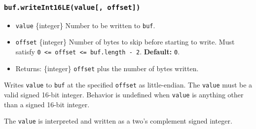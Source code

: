 \subsubsection{\texorpdfstring{\texttt{buf.writeInt16LE(value{[},\ offset{]})}}{buf.writeInt16LE(value{[}, offset{]})}}\label{buf.writeint16levalue-offset}

\begin{itemize}
\tightlist
\item
  \texttt{value} \{integer\} Number to be written to \texttt{buf}.
\item
  \texttt{offset} \{integer\} Number of bytes to skip before starting to
  write. Must satisfy
  \texttt{0\ \textless{}=\ offset\ \textless{}=\ buf.length\ -\ 2}.
  \textbf{Default:} \texttt{0}.
\item
  Returns: \{integer\} \texttt{offset} plus the number of bytes written.
\end{itemize}

Writes \texttt{value} to \texttt{buf} at the specified \texttt{offset}
as little-endian. The \texttt{value} must be a valid signed 16-bit
integer. Behavior is undefined when \texttt{value} is anything other
than a signed 16-bit integer.

The \texttt{value} is interpreted and written as a two's complement
signed integer.

\begin{Shaded}
\begin{Highlighting}[]
\NormalTok{ \{ }\NormalTok{ \} } \OperatorTok{;}

\OperatorTok{=} \NormalTok{(}\NormalTok{)}\OperatorTok{;}

\NormalTok{(}\OperatorTok{,} \NormalTok{)}\OperatorTok{;}

\OperatorTok{;}
\end{Highlighting}
\end{Shaded}

